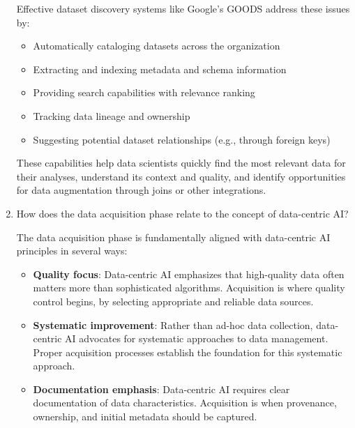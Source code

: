 \documentclass[12pt]{article}
\begin{document}
\begin{enumerate}
\begin{tcolorbox}[colback=blue!5!white,colframe=blue!75!black,title=Solution]
    Effective dataset discovery systems like Google's GOODS address these issues by:
    
    \begin{itemize}
        \item Automatically cataloging datasets across the organization
        \item Extracting and indexing metadata and schema information
        \item Providing search capabilities with relevance ranking
        \item Tracking data lineage and ownership
        \item Suggesting potential dataset relationships (e.g., through foreign keys)
    \end{itemize}
    
    These capabilities help data scientists quickly find the most relevant data for their analyses, understand its context and quality, and identify opportunities for data augmentation through joins or other integrations.
    \end{tcolorbox}
    
    \item How does the data acquisition phase relate to the concept of data-centric AI?
    
    \begin{tcolorbox}[colback=blue!5!white,colframe=blue!75!black,title=Solution]
    The data acquisition phase is fundamentally aligned with data-centric AI principles in several ways:
    
    \begin{itemize}
        \item \textbf{Quality focus}: Data-centric AI emphasizes that high-quality data often matters more than sophisticated algorithms. Acquisition is where quality control begins, by selecting appropriate and reliable data sources.
        
        \item \textbf{Systematic improvement}: Rather than ad-hoc data collection, data-centric AI advocates for systematic approaches to data management. Proper acquisition processes establish the foundation for this systematic approach.
        
        \item \textbf{Documentation emphasis}: Data-centric AI requires clear documentation of data characteristics. Acquisition is when provenance, ownership, and initial metadata should be captured.
        

\end{itemize}
\end{tcolorbox}
\end{enumerate}
\end{document}
